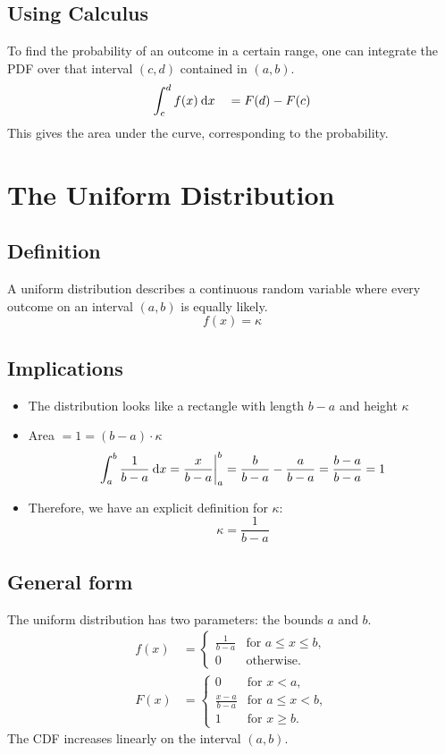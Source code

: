 \documentclass[11pt,leqno,letterpaper]{article}
\begin{document}
\subsection{Using Calculus}
To find the probability of an outcome in a certain range,
one can integrate the PDF over that interval
$(c,d)$ contained in $(a,b)$.
\[
\int_c^d f(x) \:\mathrm{d}x \quad = F(d) - F(c)
\]
This gives the area under the curve, corresponding to the probability.

\section{The Uniform Distribution}
\subsection{Definition}
A uniform distribution describes a continuous random variable
where every outcome on an interval $(a,b)$ is equally likely.
\[
f(x) = \kappa
\]
\subsection{Implications}
\begin{itemize}
\item The distribution looks like a rectangle
with length $b-a$ and height $\kappa$
\item Area $= 1 = (b-a)\cdot \kappa$
\[
\int_a^b \frac{1}{b-a} \:\mathrm{d}x = \frac{x}{b-a}\bigg|_a^b
= \frac{b}{b-a} - \frac{a}{b-a} = \frac{b-a}{b-a} = 1
\]
\item Therefore, we have an explicit definition for $\kappa$:
\[
\kappa = \frac{1}{b-a}
\]
\end{itemize}
\subsection{General form}
The uniform distribution has two parameters: the bounds $a$ and $b$.
\begin{align*}
\tag{PDF}
f(x)&=
\begin{cases}
\frac{1}{b-a} & \text{for } a \leq x \leq b,\\
0 & \text{otherwise}.
\end{cases} \\
\tag{CDF}
F(x)&=
\begin{cases}
0 & \text{for } x < a,\\
\frac{x-a}{b-a} & \text{for } a \leq x < b,\\
1 & \text{for } x \geq b.
\end{cases}
\end{align*}
The CDF increases linearly on the interval $(a,b)$.
\end{document}
